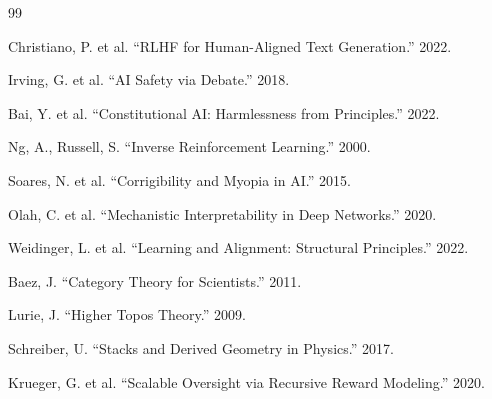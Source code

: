 \documentclass[11pt,a4paper]{article}
\theoremstyle{plain}
\begin{document}
\begin{thebibliography}{99}

 Christiano, P. et al. ``RLHF for Human-Aligned Text Generation.'' 2022.  

 Irving, G. et al. ``AI Safety via Debate.'' 2018.  

 Bai, Y. et al. ``Constitutional AI: Harmlessness from Principles.'' 2022.  

 Ng, A., Russell, S. ``Inverse Reinforcement Learning.'' 2000.  

 Soares, N. et al. ``Corrigibility and Myopia in AI.'' 2015.  

 Olah, C. et al. ``Mechanistic Interpretability in Deep Networks.'' 2020.  

 Weidinger, L. et al. ``Learning and Alignment: Structural Principles.'' 2022.  

 Baez, J. ``Category Theory for Scientists.'' 2011.  

 Lurie, J. ``Higher Topos Theory.'' 2009.  

 Schreiber, U. ``Stacks and Derived Geometry in Physics.'' 2017.  

 Krueger, G. et al. ``Scalable Oversight via Recursive Reward Modeling.'' 2020.  

\end{thebibliography}
\end{document}
